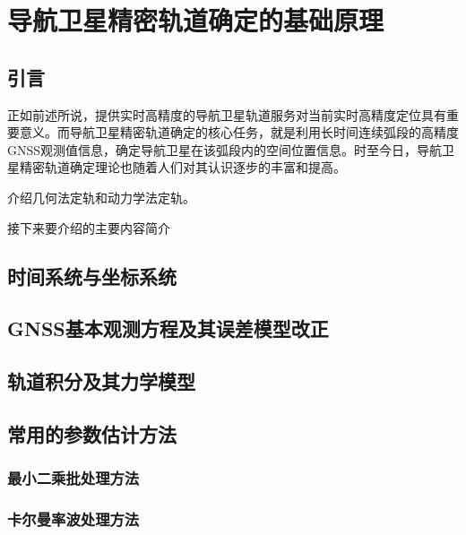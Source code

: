 
\chapter{导航卫星精密轨道确定的基础原理}

\section{引言}

正如前述所说，提供实时高精度的导航卫星轨道服务对当前实时高精度定位具有重要意义。而导航卫星精密轨道确定的核心任务，就是利用长时间连续弧段的高精度GNSS观测值信息，确定导航卫星在该弧段内的空间位置信息。时至今日，导航卫星精密轨道确定理论也随着人们对其认识逐步的丰富和提高。

介绍几何法定轨和动力学法定轨。

接下来要介绍的主要内容简介

\section{时间系统与坐标系统}



\section{GNSS基本观测方程及其误差模型改正}

\section{轨道积分及其力学模型}

\section{常用的参数估计方法}

\subsection{最小二乘批处理方法}

\subsection{卡尔曼率波处理方法}